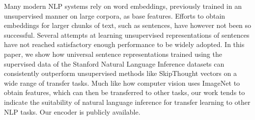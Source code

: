 Many modern NLP systems rely on word embeddings, previously trained in an unsupervised manner on large corpora, as base features. Efforts to obtain embeddings for larger chunks of text, such as sentences, have however not been so successful. Several attempts at learning unsupervised representations of sentences have not reached satisfactory enough performance to be widely adopted. In this paper, we show how universal sentence representations trained using the supervised data of the Stanford Natural Language Inference datasets can consistently outperform unsupervised methods like SkipThought vectors on a wide range of transfer tasks. Much like how computer vision uses ImageNet to obtain features, which can then be transferred to other tasks, our work tends to indicate the suitability of natural language inference for transfer learning to other NLP tasks. Our encoder is publicly available.
